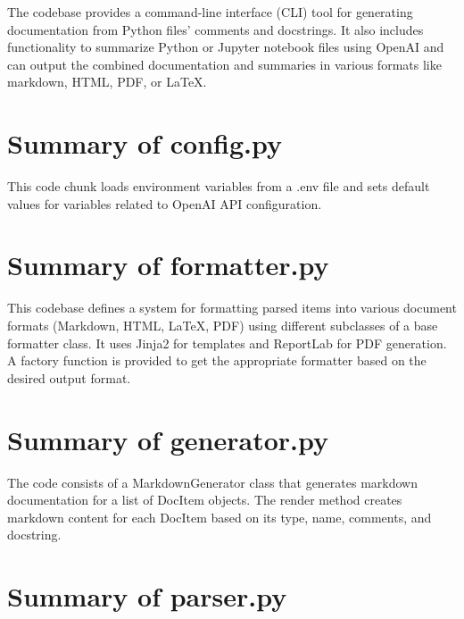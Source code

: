 \documentclass{article}
\begin{document}
The codebase provides a command-line interface (CLI) tool for generating documentation from Python files' comments and docstrings. It also includes functionality to summarize Python or Jupyter notebook files using OpenAI and can output the combined documentation and summaries in various formats like markdown, HTML, PDF, or LaTeX.







\section{Summary of config.py}


This code chunk loads environment variables from a .env file and sets default values for variables related to OpenAI API configuration.







\section{Summary of formatter.py}


This codebase defines a system for formatting parsed items into various document formats (Markdown, HTML, LaTeX, PDF) using different subclasses of a base formatter class. It uses Jinja2 for templates and ReportLab for PDF generation. A factory function is provided to get the appropriate formatter based on the desired output format.







\section{Summary of generator.py}


The code consists of a MarkdownGenerator class that generates markdown documentation for a list of DocItem objects. The render method creates markdown content for each DocItem based on its type, name, comments, and docstring.







\section{Summary of parser.py}
\end{document}
